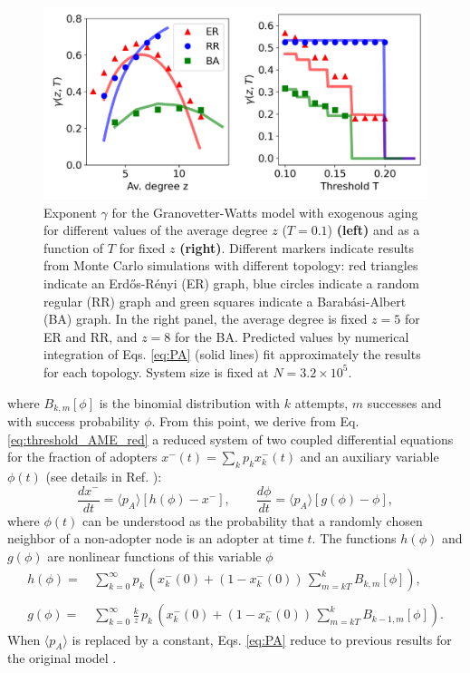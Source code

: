 \begin{figure}
    \centering \captionsetup{font=sf}
    \includegraphics[width=0.7\columnwidth]{Figs/Aging_Threshold/EXO.pdf}
    \caption[Exponent $\gamma$ for the Granovetter-Watts model with exogenous aging]{\label{fig:exo_exp} Exponent $\gamma$ for the Granovetter-Watts model with exogenous aging for different values of the average degree $z$ ($T = 0.1$) \textbf{(left)} and as a function of  $T$ for fixed $z$ \textbf{(right)}. Different markers indicate results from Monte Carlo simulations with different topology: red triangles indicate an Erd\H{o}s-R\'enyi (ER) graph, blue circles indicate a random regular (RR) graph and green squares indicate a Barab\'asi-Albert (BA) graph. In the right panel, the average degree is fixed $z = 5$ for ER and RR, and $z = 8$ for the BA. Predicted values by numerical integration of Eqs. \eqref{eq:PA} (solid lines) fit approximately the results for each topology. System size is fixed at $N = 3.2 \times 10^5$.}
    \end{figure}

where $B_{k,m}[\phi]$ is the binomial distribution with $k$ attempts, $m$ successes and with success probability $\phi$. From this point, we derive from Eq. \eqref{eq:threshold_AME_red} a reduced system of two coupled differential equations for the fraction of adopters $x^{-}(t) = \sum_k p_k x^{-}_{k} (t)$ and an auxiliary variable $\phi (t)$ (see details in Ref. \cite{gleeson-2013}):
\begin{equation}
    \label{eq:PA}
        \frac{d x^{-}}{dt} = \langle p_A \rangle [ h(\phi) - x^{-} ], \quad \quad \frac{d \phi}{dt} = \langle p_A \rangle [ g(\phi) - \phi ],
\end{equation}
where $\phi(t)$ can be understood as the probability that a randomly chosen neighbor of a non-adopter node is an adopter at time $t$. The functions $h(\phi)$ and $g(\phi)$ are nonlinear functions of this variable $\phi$
\begin{align}
    h (\phi)  = & \,  \sum_{k=0}^{\infty} p_k\,  \left( x^{-}_{k} (0) + (1 - x^{-}_{k} (0))\,  \sum_{m = kT}^{k} B_{k,m}[\phi]\right),\nonumber\\
    \\
    g (\phi)  = & \, \sum_{k=0}^{\infty} \frac{k}{z}\,  p_k \,  \left( x^{-}_{k} (0) + (1 - x^{-}_{k} (0)) \, \sum_{m = kT}^{k} B_{k-1,m}[\phi]\right). \nonumber
\end{align}
 When $\langle p_A \rangle$ is replaced by a constant, Eqs. \eqref{eq:PA} reduce to previous results for the original model \cite{gleeson-2008}.
 
